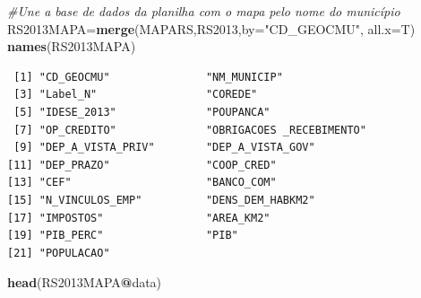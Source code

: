 \documentclass[12pt,brazil,oneside]{book}
\newenvironment{Shaded}{\begin{snugshade}}{\end{snugshade}}
\newcommand{\CommentTok}[1]{\textcolor[rgb]{0.56,0.35,0.01}{\textit{#1}}}
\newcommand{\DataTypeTok}[1]{\textcolor[rgb]{0.13,0.29,0.53}{#1}}
\newcommand{\KeywordTok}[1]{\textcolor[rgb]{0.13,0.29,0.53}{\textbf{#1}}}
\newcommand{\NormalTok}[1]{#1}
\newcommand{\OperatorTok}[1]{\textcolor[rgb]{0.81,0.36,0.00}{\textbf{#1}}}
\newcommand{\StringTok}[1]{\textcolor[rgb]{0.31,0.60,0.02}{#1}}
\begin{document}
\begin{Shaded}
\begin{Highlighting}[]
\CommentTok{#Une a base de dados da planilha com o mapa pelo nome do município}
\NormalTok{RS2013MAPA=}\KeywordTok{merge}\NormalTok{(MAPARS,RS2013,}\DataTypeTok{by=}\StringTok{"CD_GEOCMU"}\NormalTok{, }\DataTypeTok{all.x=}\NormalTok{T) }
\KeywordTok{names}\NormalTok{(RS2013MAPA)}
\end{Highlighting}
\end{Shaded}

\begin{verbatim}
 [1] "CD_GEOCMU"               "NM_MUNICIP"             
 [3] "Label_N"                 "COREDE"                 
 [5] "IDESE_2013"              "POUPANCA"               
 [7] "OP_CREDITO"              "OBRIGACOES _RECEBIMENTO"
 [9] "DEP_A_VISTA_PRIV"        "DEP_A_VISTA_GOV"        
[11] "DEP_PRAZO"               "COOP_CRED"              
[13] "CEF"                     "BANCO_COM"              
[15] "N_VINCULOS_EMP"          "DENS_DEM_HABKM2"        
[17] "IMPOSTOS"                "AREA_KM2"               
[19] "PIB_PERC"                "PIB"                    
[21] "POPULACAO"              
\end{verbatim}

\begin{Shaded}
\begin{Highlighting}[]
\KeywordTok{head}\NormalTok{(RS2013MAPA}\OperatorTok{@}\NormalTok{data)}
\end{Highlighting}
\end{Shaded}
\end{document}
